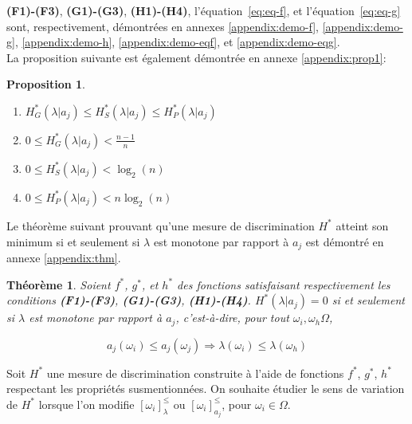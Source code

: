 \documentclass[a4paper]{article}
\newtheorem{prop}{Proposition}
\newtheorem{thm}{Théorème}
\renewcommand{\eqref}[1]{équation~\ref{#1}}
\begin{document}
\textbf{(F1)-(F3)}, \textbf{(G1)-(G3)}, \textbf{(H1)-(H4)}, l'\eqref{eq:eq-f}, et
l'\eqref{eq:eq-g} sont, respectivement, démontrées en annexes
\ref{appendix:demo-f}, \ref{appendix:demo-g}, \ref{appendix:demo-h},
\ref{appendix:demo-eqf}, et \ref{appendix:demo-eqg}.\\

La proposition suivante est également démontrée en annexe \ref{appendix:prop1}: 

\begin{prop}
    \begin{enumerate}
        \item $H^*_G(\lambda|a_j) \leq H^*_S(\lambda|a_j) \leq
            H^*_P(\lambda|a_j)$
        \item $0 \leq H^*_G(\lambda|a_j) < \frac{n-1}{n}$
        \item $0 \leq H^*_S(\lambda|a_j) < \log_{2}(n)$
        \item $0 \leq H^*_P(\lambda|a_j) < n \log_{2}(n)$
    \end{enumerate}
\label{prop:prop1}
\end{prop}

Le théorème suivant prouvant qu'une mesure de discrimination $H^*$ atteint son
minimum si et seulement si $\lambda$ est monotone par rapport à $a_j$ est
démontré en annexe \ref{appendix:thm}.

\begin{thm}

Soient $f^*$, $g^*$, et $h^*$ des fonctions satisfaisant respectivement les
    conditions \textbf{(F1)-(F3)}, \textbf{(G1)-(G3)}, \textbf{(H1)-(H4)}.
    $H^*(\lambda|a_j) = 0$ si et seulement si $\lambda$ est monotone par rapport
    à $a_j$, c'est-à-dire, pour tout $\omega_i, \omega_h \Omega$,

    $$ a_j(\omega_i) \leq a_j(\omega_j) \Rightarrow \lambda(\omega_i) \leq
    \lambda(\omega_h) $$
\label{thm:thm-H}
\end{thm}

Soit $H^*$ une mesure de discrimination construite à l'aide de fonctions $f^*$,
$g^*$, $h^*$ respectant les propriétés susmentionnées. On souhaite étudier le
sens de variation de $H^*$ lorsque l'on modifie $[\omega_i]^{\leq}_{\lambda}$ ou
$[\omega_i]^{\leq}_{a_j}$, pour $\omega_i \in \Omega$. \\
\end{document}
